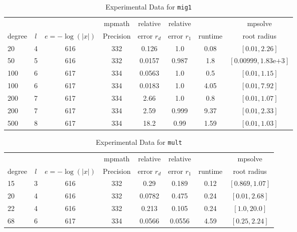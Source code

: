 \documentclass[sigconf]{acmart}
\begin{document}
\begin{table}[t]
\caption{Experimental Data for \texttt{mig1}} %
\label{tab:mig1}
\vskip -0.15in
\begin{center}
\begin{small}
\begin{sc}
\begin{tabular}{lccccccc}
\toprule
&  &  & mpmath & relative  & relative &  & mpsolve \\
degree  & $l$& $e=-\log(|x|)$& Precision &error $r_d$       & error $r_1$ &runtime& root radius\\
\midrule
 20 & 4 & 616 & 332 & 0.126 & 1.0 & 0.08 & $[0.01, 2.26]$\\
  50 & 5 & 616 & 332 & 0.0157 & 0.987 & 1.8 & $[0.00999, 1.83\text{e+}3]$\\
 100 & 6 & 617 & 334 & 0.0563 & 1.0 & 0.5 & $[0.01, 1.15]$\\
 100 & 6 & 617 & 334 & 0.0183 & 1.0 & 4.05 & $[0.01, 7.92]$\\
 200 & 7 & 617 & 334 & 2.66 & 1.0 & 0.8 & $[0.01, 1.07]$\\
 200 & 7 & 617 & 334 & 2.59 & 0.999 & 9.37 & $[0.01, 2.33]$\\
 500 & 8 & 617 & 334 & 18.2 & 0.99 & 1.59 & $[0.01, 1.03]$\\
\bottomrule
\end{tabular}
\end{sc}
\end{small}
\end{center}
\vskip 0.05in
\end{table}


\begin{table}[t]
\caption{Experimental Data for \texttt{mult}} %
\label{tab:mult}
\vskip -0.15in
\begin{center}
\begin{small}
\begin{sc}
\begin{tabular}{lccccccc}
\toprule
&  &  & mpmath & relative  & relative &  & mpsolve \\
degree  & $l$& $e=-\log(|x|)$& Precision &error $r_d$       & error $r_1$ &runtime& root radius\\
\midrule
 15 & 3 & 616 & 332 & 0.29 & 0.189 & 0.12 & $[0.869, 1.07]$\\
 20 & 4 & 616 & 332 & 0.0782 & 0.475 & 0.24 & $[0.01, 2.68]$\\
 22 & 4 & 616 & 332 & 0.213 & 0.105 & 0.24 & $[1.0, 20.0]$\\
  68 & 6 & 617 & 334 & 0.0566 & 0.0556 & 4.59 & $[0.25, 2.24]$\\
\bottomrule
\end{tabular}
\end{sc}
\end{small}
\end{center}
\vskip 0.05in
\end{table}
\end{document}
